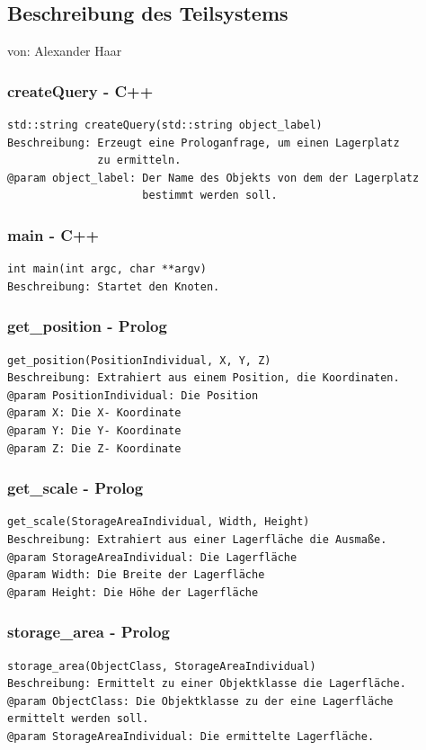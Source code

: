 \documentclass{suturo}
\makeatletter
\newcommand{\chapterauthor}[1]{%
  {\parindent0pt\vspace*{-27pt}%
  \linespread{0}\small\begin{flushright}von: #1\end{flushright}%
  \par\nobreak\vspace*{0pt}}
  \@afterheading%
}
\makeatother
\begin{document}
\subsection{Beschreibung des Teilsystems}
\chapterauthor{Alexander Haar}

\subsubsection{createQuery - C++}
\begin{verbatim}
std::string createQuery(std::string object_label)
Beschreibung: Erzeugt eine Prologanfrage, um einen Lagerplatz 
              zu ermitteln.
@param object_label: Der Name des Objekts von dem der Lagerplatz 
                     bestimmt werden soll.
\end{verbatim}

\subsubsection{main - C++}
\begin{verbatim}
int main(int argc, char **argv)
Beschreibung: Startet den Knoten.
\end{verbatim}


\subsubsection{get\_position - Prolog}
\begin{verbatim}
get_position(PositionIndividual, X, Y, Z)
Beschreibung: Extrahiert aus einem Position, die Koordinaten.
@param PositionIndividual: Die Position
@param X: Die X- Koordinate
@param Y: Die Y- Koordinate
@param Z: Die Z- Koordinate
\end{verbatim}

\subsubsection{get\_scale - Prolog}
\begin{verbatim}
get_scale(StorageAreaIndividual, Width, Height)
Beschreibung: Extrahiert aus einer Lagerfläche die Ausmaße.
@param StorageAreaIndividual: Die Lagerfläche
@param Width: Die Breite der Lagerfläche
@param Height: Die Höhe der Lagerfläche
\end{verbatim}

\subsubsection{storage\_area - Prolog}
\begin{verbatim}
storage_area(ObjectClass, StorageAreaIndividual)
Beschreibung: Ermittelt zu einer Objektklasse die Lagerfläche.
@param ObjectClass: Die Objektklasse zu der eine Lagerfläche
ermittelt werden soll.
@param StorageAreaIndividual: Die ermittelte Lagerfläche.
\end{verbatim}
\end{document}
